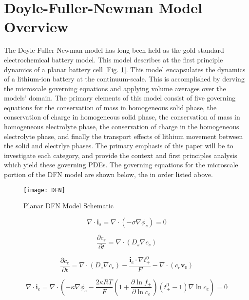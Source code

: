 \documentclass[lettersize,journal]{IEEEtran}
\begin{document}
\section{Doyle-Fuller-Newman Model Overview}
The Doyle-Fuller-Newman model has long been held as the gold standard electrochemical battery model. This model describes at the first principle dynamics of a planar battery cell [Fig. \ref{DFN_schematic}]. This model encapsulates the dynamics of a lithium-ion battery at the continuum-scale. This is accomplished by derving the microscale governing equations and applying volume averages over the models' domain. The primary elements of this model consist of five governing equations for the conservation of mass in homogeneous solid phase, the conservation of charge in homogeneous solid phase, the conservation of mass in homogeneous electrolyte phase, the conservation of charge in the homogeneous electrolyte phase, and finally the transport effects of lithium movement between the solid and electrlye phases. The primary emphasis of this paper will be to investigate each category, and provide the context and first principles analysis which yield these governing PDEs. The governing equations for the microscale portion of the DFN model are shown below, the in order listed above.

\begin{figure}
  \centering
  \texttt{[image: DFN]}
  \caption{Planar DFN Model Schematic}
  \label{DFN_schematic}
\end{figure}

\begin{equation} \label{COC_s}
\nabla \cdot \mathbf{i}_{s}=\nabla \cdot\left(-\sigma \nabla \phi_{s}\right)=0
\end{equation}

\begin{equation} \label{COM_s}
\frac{\partial c_{s}}{\partial t}=\nabla \cdot\left(D_{s} \nabla c_{s}\right)
\end{equation}

\begin{equation} \label{COM_e}
\frac{\partial c_{e}}{\partial t}=\nabla \cdot\left(D_{e} \nabla c_{e}\right)-\frac{\mathbf{i}_{e} \cdot \nabla t_{+}^{0}}{F}-\nabla \cdot\left(c_{e} \mathbf{v}_{0}\right)
\end{equation}

\begin{equation}\label{COC_e}
\nabla \cdot \mathbf{i}_{e}=\nabla \cdot\left(-\kappa \nabla \phi_{e}-\frac{2 \kappa R T}{F}\left(1+\frac{\partial \ln f_{\pm}}{\partial \ln c_{e}}\right)\left(t_{+}^{0}-1\right) \nabla \ln c_{e}\right)=0
\end{equation}
\end{document}
